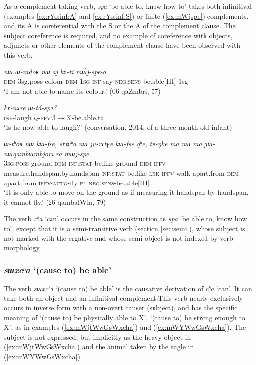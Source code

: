 \documentclass[oneside,a4paper,11pt]{article}
\newcommand{\ipa}[1]{\textit{\phon#1}}
\newcommand{\jpg}[2]{\ipa{#1} `#2'}
\newcommand{\refb}[1]{(\ref{#1})}
\begin{document}
As a complement-taking verb, \jpg{spa}{be able to, know how to} takes both infinitival (examples \ref{ex:rYo:inf:A} and \ref{ex:rYo:inf:S}) or finite (\ref{ex:mWjspe}) complements, and its A is coreferential with the S or the A of the complement clause. The subject coreference is required, and no example of coreference with objects, adjuncts or other elements of the complement clause have been observed with this verb.

\begin{exe}
\ex  \label{ex:rYo:inf:A}
\gll
\ipa{nɯ} 	\ipa{ɯ-mdoʁ} 	\ipa{nɯ} 	\ipa{aj} 	\ipa{kɤ-ti} 	\ipa{mɯ́j-spe-a} \\
\textsc{dem} 3sg.poss-colour \textsc{dem} \textsc{1sg} \textsc{inf}-say \textsc{neg:sens}-be.able[III]-1sg \\
\glt `I am not able to name its colour.' (06-qaZmbri, 57)
\end{exe}

\begin{exe}
\ex  \label{ex:rYo:inf:S}
\gll 
 \ipa{kɤ-nɤre} 	\ipa{ɯ-tá-spa?}\\
 \textsc{inf}-laugh \textsc{q-pfv}:3$\rightarrow$3'-be.able.to\\
 \glt `Is he now able to laugh?' (conversation, 2014, of a three month old infant)
\end{exe}


\begin{exe}
\ex \label{ex:mWjspe}
\gll \ipa{ɯ-tʰoʁ}	\ipa{nɯ}	\ipa{kɯ-fse,}	\ipa{sɤtɕʰa}	\ipa{nɯ}	\ipa{ju-rɤtɣe}	\ipa{kɯ-fse}	\ipa{qʰe,}	\ipa{tu-ŋke}	\ipa{ma}	\ipa{nɯ}	\ipa{ma}	\ipa{ɲɯ-nɯqambɯmbjom}	\ipa{ra}	\ipa{mɯ́j-spe} \\
\textsc{3sg.poss}-ground \textsc{dem} \textsc{inf:stat}-be.like ground \textsc{dem}  \textsc{ipfv}-measure.handspan.by.handspan \textsc{inf:stat}-be.like  \textsc{lnk} \textsc{ipfv}-walk apart.from \textsc{dem} apart.from \textsc{ipfv-auto}-fly \textsc{pl} \textsc{neg:sens}-be.able[III] \\
\glt `It is only able to move on the ground as if measuring it handspan by handspan, it cannot fly.' (26-qambalWla, 79)
\end{exe}
 
The verb \jpg{cʰa}{can} occurs in the same construction as \jpg{spa}{be able to, know how to}, except that it is a semi-transitive verb (section \ref{sec:semi}), whose subject is not marked with the ergative and whose semi-object is not indexed by verb morphology.


  \subsubsection{\jpg{sɯxcʰa}{(cause to) be able}} \label{sec:sWxcha}
The verb \jpg{sɯxcʰa}{(cause to) be able}  is the causative derivation of \jpg{cʰa}{can}.  It can take both an object and an infinitival complement.This verb nearly exclusively occurs in inverse form with a non-overt causer (subject), and has the specific meaning of  `(cause to) be physically able to X', `(cause to) be strong enough to X', as in examples (\ref{ex:mWjtWwGsWxcha}) and (\ref{ex:mWYWwGsWxcha}). The subject is not expressed, but implicitly as the heavy object in \refb{ex:mWjtWwGsWxcha} and the animal taken by the eagle in \refb{ex:mWYWwGsWxcha}.
\end{document}
